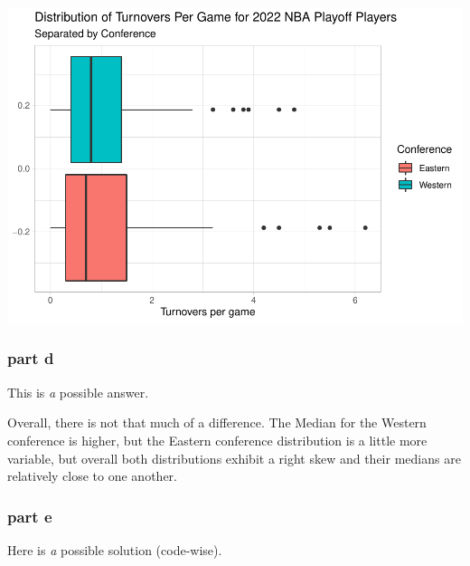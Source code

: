 \documentclass[
]{article}
\begin{document}
\includegraphics{Monday-Lab-Worksheet-Answers_files/figure-latex/unnamed-chunk-15-1.pdf}

\hypertarget{part-d}{%
\subsubsection{part d}\label{part-d}}

This is \emph{a} possible answer.

Overall, there is not that much of a difference. The Median for the
Western conference is higher, but the Eastern conference distribution is
a little more variable, but overall both distributions exhibit a right
skew and their medians are relatively close to one another.

\hypertarget{part-e}{%
\subsubsection{part e}\label{part-e}}

Here is \emph{a} possible solution (code-wise).
\end{document}
